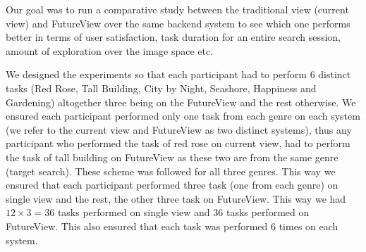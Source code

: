 \documentclass[english]{tktltiki}
\begin{document}
Our goal was to run a comparative study between the traditional view (current view) and FutureView over the same backend system to see which one performs better in terms of user satisfaction, task duration for an entire search session, amount of exploration over the image space etc.

We designed the experiments so that each participant had to perform 6 distinct tasks (Red Rose, Tall Building, City by Night, Seashore, Happiness and Gardening) altogether three being on the FutureView and the rest otherwise. We ensured each participant performed only one task from each genre on each system (we refer to the current view and FutureView as two distinct systems), thus any participant who performed the task of red rose on current view, had to perform the task of tall building on FutureView as these two are from the same genre (target search). These scheme was followed for all three genres. This way we ensured that each participant performed three task (one from each genre) on single view and the rest, the other three task on FutureView. This way we had $12 \times 3 = 36$ tasks performed on single view and $36$ tasks performed on FutureView. This also ensured that each task was performed $6$ times on each system.
\end{document}
